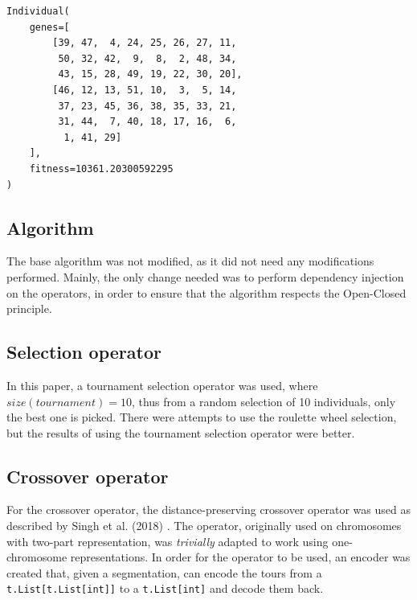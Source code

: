 \documentclass[conference]{IEEEtran}
\begin{document}
\begin{lstlisting}[caption=Example of individual,captionpos=b]
Individual(
    genes=[
        [39, 47,  4, 24, 25, 26, 27, 11,
         50, 32, 42,  9,  8,  2, 48, 34,
         43, 15, 28, 49, 19, 22, 30, 20],
        [46, 12, 13, 51, 10,  3,  5, 14,
         37, 23, 45, 36, 38, 35, 33, 21,
         31, 44,  7, 40, 18, 17, 16,  6,
          1, 41, 29]
    ],
    fitness=10361.20300592295
)
\end{lstlisting}

\subsection{Algorithm}
The base algorithm was not modified, as it did not need any modifications performed. Mainly, the only change needed was to
perform dependency injection on the operators, in order to ensure that the algorithm respects the Open-Closed principle.

\subsection{Selection operator}
In this paper, a tournament selection operator was used, where $size(tournament) = 10$, thus from a random selection of 10
individuals, only the best one is picked. There were attempts to use the roulette wheel selection, but the results of using
the tournament selection operator were better.

\subsection{Crossover operator}
For the crossover operator, the distance-preserving crossover operator was used as described by Singh et al. (2018) \cite{b7}. The operator,
originally used on chromosomes with two-part representation, was \textit{trivially} adapted to work using one-chromosome
representations. In order for the operator to be used, an encoder was created that, given a segmentation, can encode the
tours from a \texttt{t.List[t.List[int]]} to a \texttt{t.List[int]} and decode them back.
\end{document}
